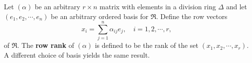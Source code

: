 Let $(\alpha)$ be an arbitrary $r \times n$ matrix with elements in a division ring $\Delta$ and let $(e_1, e_2, \cdots, e_n)$ be an arbitrary ordered basis for $\Re$. Define the row vectors
$$
x_i = \sum_{j=1}^{n} \alpha_{ij} e_j, \quad i = 1, 2, \cdots, r,
$$
of $\Re$. The \textbf{row rank} of $(\alpha)$ is defined to be the rank of the set $(x_1, x_2, \cdots, x_r)$. A different choice of basis yields the same result.
